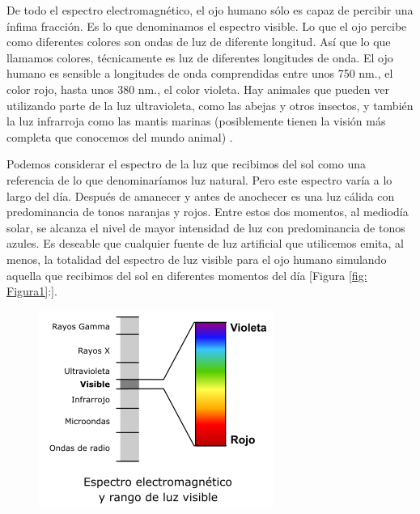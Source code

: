 \documentclass[10pt]{article}
\begin{document}
\setlength{\parskip}{2mm}

De todo el espectro electromagnético, el ojo humano sólo es capaz de percibir una ínfima fracción. Es lo que denominamos el espectro visible. Lo que el ojo percibe como diferentes colores son ondas de luz de diferente longitud. Así que lo que llamamos colores, técnicamente es luz de diferentes longitudes de onda. El ojo humano es sensible a longitudes de onda comprendidas entre unos 750 nm., el color rojo, hasta unos 380 nm., el color violeta. Hay animales que pueden ver utilizando parte de la luz ultravioleta, como las abejas y otros insectos, y también la luz infrarroja como las mantis marinas (posiblemente tienen la visión más completa que conocemos del mundo animal) \cite{IEEEreferencias:Ref13}.

\setlength{\parskip}{2mm}

Podemos considerar el espectro de la luz que recibimos del sol como una referencia de lo que denominaríamos luz natural. Pero este espectro varía a lo largo del día. Después de amanecer y antes de anochecer es una luz cálida con predominancia de tonos naranjas y rojos. Entre estos dos momentos, al mediodía solar, se alcanza el nivel de mayor intensidad de luz con predominancia de tonos azules. Es deseable que cualquier fuente de luz artificial que utilicemos emita, al menos, la totalidad del espectro de luz visible para el ojo humano simulando aquella que recibimos del sol en diferentes momentos del día \cite{IEEEreferencias:Ref13} [Figura \ref{fig: Figura1}:]. 

\begin{figure}[H]
	\begin{center}
\includegraphics[scale = 0.85]{Imagenes/espectro.png}
	\end{center} 
	 
\end{figure}
\end{document}
